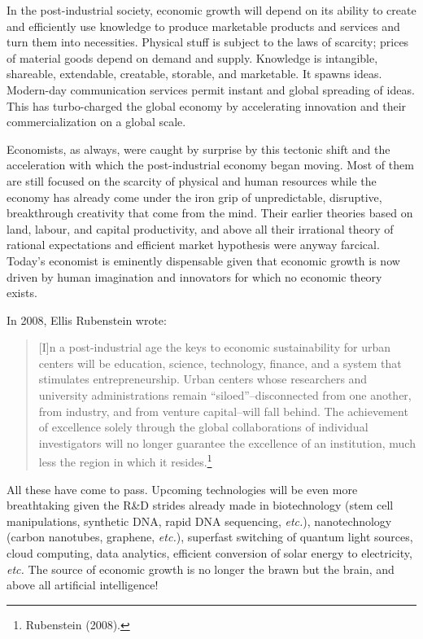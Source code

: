 \begin{multicols}{2}
\newpage

In the post-industrial society, economic growth will depend on its ability to create and efficiently use knowledge to produce marketable products and services and turn them into necessities. Physical stuff is subject to the laws of scarcity; prices of material goods depend on demand and supply. Knowledge is intangible, shareable, extendable, creatable, storable, and marketable. It spawns ideas. Modern-day communication services permit instant and global spreading of ideas. This has turbo-charged the global economy by accelerating innovation and their commercialization on a global scale.

Economists, as always, were caught by surprise by this tectonic shift and the acceleration with which the post-industrial economy began moving. Most of them are still focused on the scarcity of physical and human resources while the economy has already come under the iron grip of unpredictable, disruptive, breakthrough creativity that come from the mind. Their earlier theories based on land, labour, and capital productivity, and above all their irrational theory of rational expectations and efficient market hypothesis were anyway farcical. Today's economist is eminently dispensable given that economic growth is now driven by human imagination and innovators for which no economic theory exists.

In 2008, Ellis Rubenstein wrote:
\begin{quote}
[I]n a post-industrial age the keys to economic sustainability for urban centers will be education, science, technology, finance, and a system that stimulates entrepreneurship. Urban centers whose researchers and university administrations remain “siloed”--disconnected from one another, from industry, and from venture capital--will fall behind. The achievement of excellence solely through the global collaborations of individual investigators will no longer guarantee the excellence of an institution, much less the region in which it resides.\footnote{Rubenstein (2008).}
\end{quote}

All these have come to pass. Upcoming technologies will be even more breathtaking given the R\&D strides already made in biotechnology (stem cell manipulations, synthetic DNA, rapid DNA sequencing, \textit{etc.}), nanotechnology (carbon nanotubes, graphene, \textit{etc.}), superfast switching of quantum light sources, cloud computing, data analytics, efficient conversion of solar energy to electricity, \textit{etc.} The source of economic growth is no longer the brawn but the brain, and above all artificial intelligence! 


\end{multicols}
